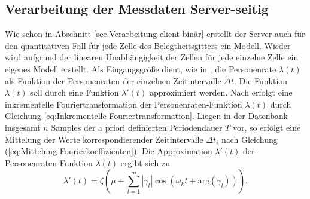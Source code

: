 \subsection{Verarbeitung der Messdaten Server-seitig}
\label{sec.Messdatenverarbeitung server quantitativ}

Wie schon in Abschnitt \ref{sec.Verarbeitung client binär} erstellt der Server auch für den quantitativen Fall für jede Zelle des Belegtheitsgitters ein Modell. Wieder wird aufgrund der linearen Unabhängigkeit der Zellen für jede einzelne Zelle ein eigenes Modell erstellt. Als Eingangsgröße dient, wie in \cite{Jovan.2016}, die Personenrate $\lambda (t)$ als Funktion der Personenraten der einzelnen Zeitintervalle $\Delta t$. Die Funktion $\lambda (t)$ soll durch eine Funktion $\lambda ' (t)$ approximiert werden. Nach \cite{Krajnik.2015b} erfolgt eine inkrementelle Fouriertransformation der Personenraten-Funktion $\lambda (t)$ durch Gleichung \ref{eq:Inkrementelle Fouriertransformation}. Liegen in der Datenbank insgesamt $n$ Samples der a priori definierten Periodendauer $T$ vor, so erfolgt eine Mittelung der Werte korrespondierender Zeitintervalle $\Delta t_i$ nach Gleichung (\ref{eq:Mittelung Fourierkoeffizienten}). Die Approximation $\lambda ' (t)$ der Personenraten-Funktion $\lambda (t)$ ergibt sich zu
\begin{equation}\label{eq:Personenraten-Funktion}
	\lambda ' (t) = \zeta (\bar{\mu} + \sum_{l=1}^{m} |\bar{\gamma}_l| \cos(\omega_k t + \mathrm{arg}(\bar{\gamma}_l))) .
\end{equation} 

